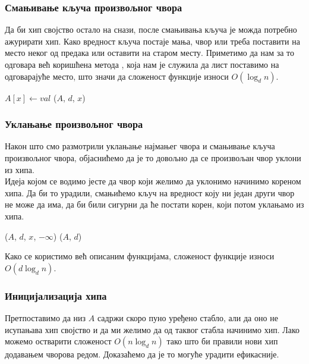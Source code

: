 \documentclass[11pt, a4paper]{article}
\theoremstyle{remark}
\numberwithin{equation}{section}
\begin{document}
	\subsubsection{Смањивање кључа произвољног чвора}
	Да би хип својство остало на снази, после смањивања кључа је можда потребно ажурирати хип. Како вредност кључа постаје мања, чвор или треба поставити на место неког од предака или оставити на старом месту. Приметимо да нам за то одговара већ коришћена метода , која нам је служила да лист поставимо на одговарајуће место, што значи да сложеност функције  износи $O(\log_d n)$.
	
	\begin{codebox}
		\li $A[x] \gets val$
		\li {}($A$, $d$, $x$)
	\end{codebox}

	\subsubsection{Уклањање произвољног чвора}
	Након што смо размотрили уклањање најмањег чвора и смањивање кључа произвољног чвора, објаснићемо да је то довољно да се произвољан чвор уклони из хипа. \\

	\indent Идеја којом се водимо јесте да чвор који желимо да уклонимо начинимо кореном хипа. Да би то урадили, смањићемо кључ на вредност коју ни један други чвор не може да има, да би били сигурни да ће постати корен, који потом уклањамо из хипа.

	\begin{codebox}
		\Procname {\proc{Heap-Delete-Node}($A$, $d$, $x$)}
		\li {}($A$, $d$, $x$, $-\infty$)
		\li {}($A$, $d$)
	\end{codebox}

	\indent Како се користимо већ описаним функцијама, сложеност функције  износи $O(d \log_d n)$.

	\subsubsection{Иницијализација хипа}
	Претпоставимо да низ $A$ садржи скоро пуно уређено стабло, али да оно не исупањава хип својство и да ми желимо да од таквог стабла начинимо хип. Лако можемо остварити сложеност $O(n \log_d n)$ тако што би правили нови хип додавањем чворова редом. Доказаћемо да је то могуће урадити ефикасније. \\
\end{document}
